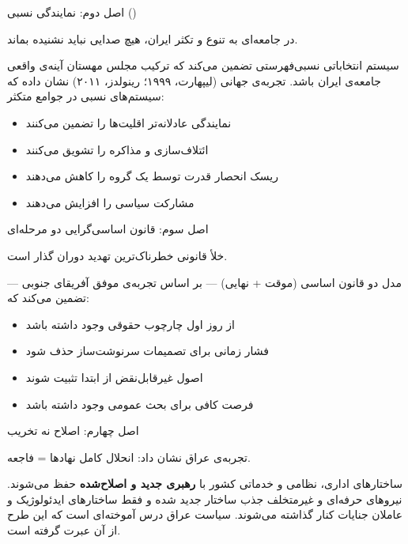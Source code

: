 \documentclass[12pt,a4paper,twoside,openany]{book}
\begin{document}
	\begin{principlebox}{اصل دوم: نمایندگی نسبی ()}
		\begin{quotebox}
			در جامعه‌ای به تنوع و تکثر ایران، هیچ صدایی نباید نشنیده بماند.
		\end{quotebox}
		
		سیستم انتخاباتی نسبی‌فهرستی تضمین می‌کند که ترکیب مجلس مهستان آینه‌ی واقعی جامعه‌ی
		ایران باشد. تجربه‌ی جهانی (لیپهارت، ۱۹۹۹؛ رینولدز، ۲۰۱۱) نشان داده که سیستم‌های
		نسبی در جوامع متکثر:
		\begin{itemize}
			\item نمایندگی عادلانه‌تر اقلیت‌ها را تضمین می‌کنند
			\item ائتلاف‌سازی و مذاکره را تشویق می‌کنند
			\item ریسک انحصار قدرت توسط یک گروه را کاهش می‌دهند
			\item مشارکت سیاسی را افزایش می‌دهند
		\end{itemize}
	\end{principlebox}
	
	\begin{principlebox}{اصل سوم: قانون اساسی‌گرایی دو مرحله‌ای}
		\begin{quotebox}
			خلأ قانونی خطرناک‌ترین تهدید دوران گذار است.
		\end{quotebox}
		
		مدل دو قانون اساسی (موقت + نهایی) --- بر اساس تجربه‌ی موفق آفریقای جنوبی ---
		تضمین می‌کند که:
		\begin{itemize}
			\item از روز اول چارچوب حقوقی وجود داشته باشد
			\item فشار زمانی برای تصمیمات سرنوشت‌ساز حذف شود
			\item اصول غیرقابل‌نقض از ابتدا تثبیت شوند
			\item فرصت کافی برای بحث عمومی وجود داشته باشد
		\end{itemize}
	\end{principlebox}
	
	\begin{principlebox}{اصل چهارم: اصلاح نه تخریب}
		\begin{quotebox}
			تجربه‌ی عراق نشان داد: انحلال کامل نهادها = فاجعه.
		\end{quotebox}
		
		ساختارهای اداری، نظامی و خدماتی کشور با \textbf{رهبری جدید و اصلاح‌شده} حفظ می‌شوند.
		نیروهای حرفه‌ای و غیرمتخلف جذب ساختار جدید شده و فقط ساختارهای ایدئولوژیک و عاملان
		جنایات کنار گذاشته می‌شوند. سیاست  عراق درس آموخته‌ای است
		که این طرح از آن عبرت گرفته است.
	\end{principlebox}
	
\end{document}
